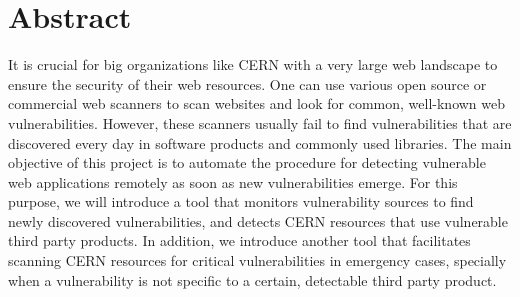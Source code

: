 \chapter*{Abstract}
\thispagestyle{empty}

It is crucial for big organizations like CERN with a very large web landscape to ensure the security of their web resources. One can use various open source or commercial web scanners to scan websites and look for common, well-known web vulnerabilities. However, these scanners usually fail to find vulnerabilities that are discovered every day in software products and commonly used libraries. The main objective of this project is to automate the procedure for detecting vulnerable web applications remotely as soon as new vulnerabilities emerge. For this purpose, we will introduce a tool that monitors vulnerability sources to find newly discovered vulnerabilities, and detects CERN resources that use vulnerable third party products. In addition, we introduce another tool that facilitates scanning CERN resources for critical vulnerabilities in emergency cases, specially when a vulnerability is not specific to a certain, detectable third party product.